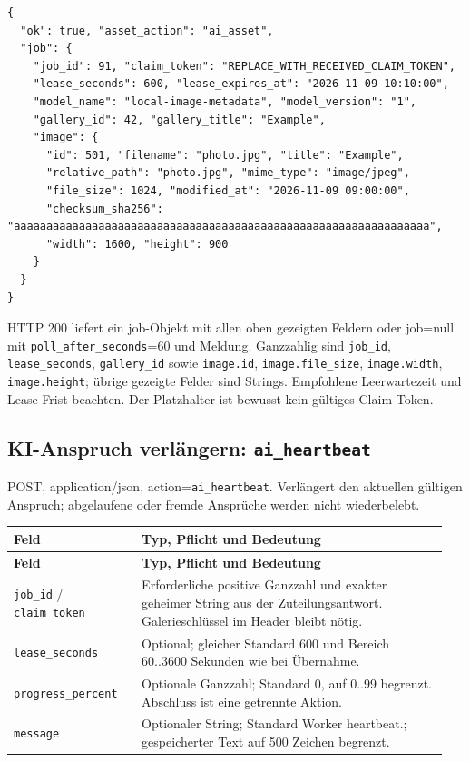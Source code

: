 \documentclass[11pt,a4paper]{article}
\newcommand{\codeword}[1]{\nolinkurl{#1}}
\begin{document}
\begin{lstlisting}[language={}]
{
  "ok": true, "asset_action": "ai_asset",
  "job": {
    "job_id": 91, "claim_token": "REPLACE_WITH_RECEIVED_CLAIM_TOKEN",
    "lease_seconds": 600, "lease_expires_at": "2026-11-09 10:10:00",
    "model_name": "local-image-metadata", "model_version": "1",
    "gallery_id": 42, "gallery_title": "Example",
    "image": {
      "id": 501, "filename": "photo.jpg", "title": "Example",
      "relative_path": "photo.jpg", "mime_type": "image/jpeg",
      "file_size": 1024, "modified_at": "2026-11-09 09:00:00",
      "checksum_sha256": "aaaaaaaaaaaaaaaaaaaaaaaaaaaaaaaaaaaaaaaaaaaaaaaaaaaaaaaaaaaaaaaa",
      "width": 1600, "height": 900
    }
  }
}
\end{lstlisting}

HTTP 200 liefert ein job-Objekt mit allen oben gezeigten Feldern oder job=null mit
\codeword{poll_after_seconds}=60 und Meldung. Ganzzahlig sind \codeword{job_id},
\codeword{lease_seconds}, \codeword{gallery_id} sowie \codeword{image.id},
\codeword{image.file_size}, \codeword{image.width}, \codeword{image.height}; übrige gezeigte
Felder sind Strings. Empfohlene Leerwartezeit und Lease-Frist beachten. Der Platzhalter ist
bewusst kein gültiges Claim-Token.

\subsection{\texorpdfstring{KI-Anspruch verlängern: \codeword{ai_heartbeat}}{KI-Anspruch verlängern: ai\_heartbeat}}

\label{api352:ai-heartbeat}

POST, application/json, action=\codeword{ai_heartbeat}. Verlängert den aktuellen gültigen
Anspruch; abgelaufene oder fremde Ansprüche werden nicht wiederbelebt.

\begin{longtable}{@{}>{\RaggedRight\arraybackslash}p{0.28\linewidth}>{\RaggedRight\arraybackslash}p{0.67\linewidth}@{}}
\toprule
\textbf{Feld} & \textbf{Typ, Pflicht und Bedeutung} \\
\midrule
\endfirsthead
\toprule
\textbf{Feld} & \textbf{Typ, Pflicht und Bedeutung} \\
\midrule
\endhead
\bottomrule
\endfoot
\codeword{job_id} / \codeword{claim_token} & Erforderliche positive Ganzzahl und exakter
geheimer String aus der Zuteilungsantwort. Galerieschlüssel im Header bleibt nötig. \\
\codeword{lease_seconds} & Optional; gleicher Standard 600 und Bereich 60..3600 Sekunden wie
bei Übernahme. \\
\codeword{progress_percent} & Optionale Ganzzahl; Standard 0, auf 0..99 begrenzt. Abschluss
ist eine getrennte Aktion. \\
\codeword{message} & Optionaler String; Standard Worker heartbeat.; gespeicherter Text auf
500 Zeichen begrenzt. \\
\end{longtable}
\end{document}
